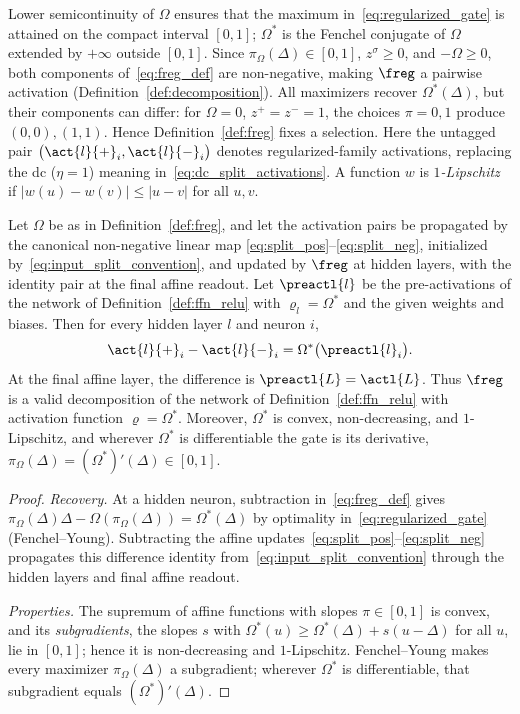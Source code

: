 Lower semicontinuity of $\Omega$ ensures that the maximum in~\eqref{eq:regularized_gate} is attained on the compact interval $[0,1]$; $\Omega^*$ is the Fenchel conjugate of $\Omega$ extended by $+\infty$ outside $[0,1]$. Since $\pi_\Omega(\Delta) \in [0,1]$, $z^\sigma \ge 0$, and $-\Omega \ge 0$, both components of~\eqref{eq:freg_def} are non-negative, making $\freg$ a pairwise activation (Definition~\ref{def:decomposition}). All maximizers recover $\Omega^*(\Delta)$, but their components can differ: for $\Omega=0$, $z^+=z^-=1$, the choices $\pi=0,1$ produce $(0,0),(1,1)$. Hence Definition~\ref{def:freg} fixes a selection. Here the untagged pair $\bigl(\act{l}{+}_i, \act{l}{-}_i\bigr)$ denotes regularized-family activations, replacing the \ac{dc} ($\eta=1$) meaning in~\eqref{eq:dc_split_activations}. A function $w$ is \emph{$1$-Lipschitz} if $|w(u)-w(v)|\le|u-v|$ for all $u,v$.

\begin{theoremenv}\label{thm:freg_validity}
Let $\Omega$ be as in Definition~\ref{def:freg}, and let the activation pairs be propagated by the canonical non-negative linear map \eqref{eq:split_pos}--\eqref{eq:split_neg}, initialized by~\eqref{eq:input_split_convention}, and updated by $\freg$ at hidden layers, with the identity pair at the final affine readout. Let $\preactl{l}$ be the pre-activations of the network of Definition~\ref{def:ffn_relu} with $\varrho_l=\Omega^*$ and the given weights and biases. Then for every hidden layer $l$ and neuron $i$,
\begin{equation}
	\act{l}{+}_i - \act{l}{-}_i = \Omega^*\bigl(\preactl{l}_i\bigr).
	\label{eq:freg_recovery}
\end{equation}
At the final affine layer, the difference is $\preactl{L}=\actl{L}$. Thus $\freg$ is a valid decomposition of the network of Definition~\ref{def:ffn_relu} with activation function $\varrho = \Omega^*$. Moreover, $\Omega^*$ is convex, non-decreasing, and $1$-Lipschitz, and wherever $\Omega^*$ is differentiable the gate is its derivative, $\pi_\Omega(\Delta) = (\Omega^*)'(\Delta) \in [0,1]$.\end{theoremenv}

\begin{proof}
\emph{Recovery.} At a hidden neuron, subtraction in~\eqref{eq:freg_def} gives $\pi_\Omega(\Delta)\Delta-\Omega(\pi_\Omega(\Delta))=\Omega^*(\Delta)$ by optimality in~\eqref{eq:regularized_gate} (Fenchel--Young). Subtracting the affine updates~\eqref{eq:split_pos}--\eqref{eq:split_neg} propagates this difference identity from~\eqref{eq:input_split_convention} through the hidden layers and final affine readout.

\emph{Properties.} The supremum of affine functions with slopes $\pi\in[0,1]$ is convex, and its \emph{subgradients}, the slopes $s$ with $\Omega^*(u)\ge\Omega^*(\Delta)+s(u-\Delta)$ for all $u$, lie in $[0,1]$; hence it is non-decreasing and $1$-Lipschitz. Fenchel--Young makes every maximizer $\pi_\Omega(\Delta)$ a subgradient; wherever $\Omega^*$ is differentiable, that subgradient equals $(\Omega^*)'(\Delta)$.
\end{proof}

